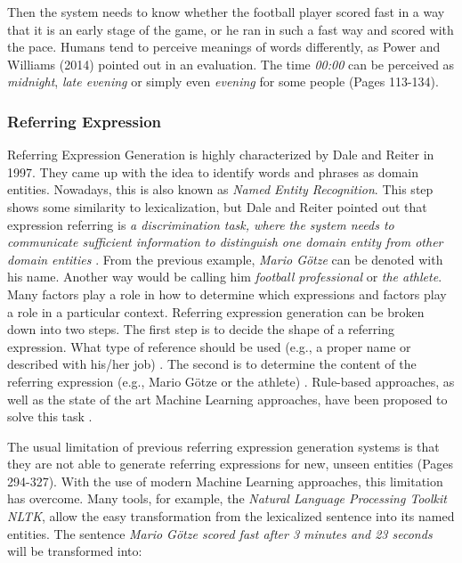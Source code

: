 Then the system needs to know whether the football player scored fast in a way that it is an early stage of the game, or he ran in such a fast way and scored with the pace. Humans tend to perceive meanings of words differently, as Power and Williams (2014) pointed out in an evaluation. The time \textit{00:00} can be perceived as \textit{midnight}, \textit{late evening} or simply even \textit{evening} for some people \cite{Power} (Pages 113-134).


\subsubsection{Referring Expression}\label{ss:ref}

Referring Expression Generation is highly characterized by Dale and Reiter in 1997. They came up with the idea to identify words and phrases as domain entities. Nowadays, this is also known as \textit{Named Entity Recognition}. This step shows some similarity to lexicalization, but Dale and Reiter pointed out that expression referring is \textit{a discrimination task, where the system needs to communicate sufficient information to distinguish one domain entity from other domain entities} \cite{reiter2}. From the previous example, \textit{Mario Götze} can be denoted with his name. Another way would be calling him \textit{football professional} or \textit{the athlete}. Many factors play a role in how to determine which expressions and factors play a role in a particular context. Referring expression generation can be broken down into two steps.
The first step is to decide the shape of a referring expression. What type of reference should be used (e.g., a proper name or described with his/her job) \cite{named}. The second is to determine the content of the referring expression (e.g., Mario Götze or the athlete) \cite{named}.
Rule-based approaches, as well as the state of the art Machine Learning approaches, have been proposed to solve this task \cite{reiter2}.  

The usual limitation of previous referring expression generation systems is that they are not able to generate referring expressions for new, unseen entities \cite{anja} (Pages 294-327). With the use of modern Machine Learning approaches, this limitation has overcome.
Many tools, for example, the \textit{Natural Language Processing Toolkit NLTK}, allow the easy transformation from the lexicalized sentence into its named entities. The sentence \textit{Mario Götze scored fast after 3 minutes and 23 seconds} will be transformed into:

